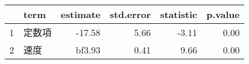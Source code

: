 \begin{tabular}{rlrrrr}
  \hline
 & term & estimate & std.error & statistic & p.value \\ 
  \hline
1 & 定数項 & -17.58 & 5.66 & -3.11 & 0.00 \\ 
  2 & 速度 & bf{3.93} & 0.41 & 9.66 & 0.00 \\ 
   \hline
\end{tabular}
